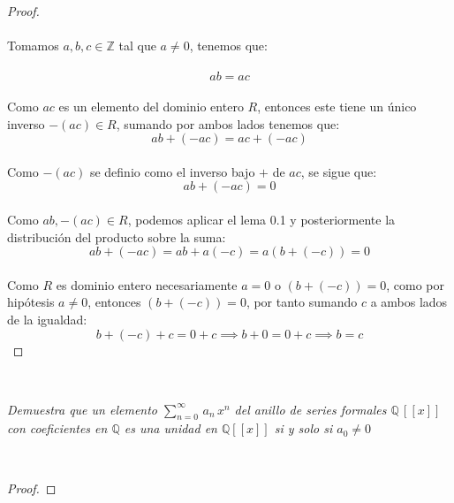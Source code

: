 \documentclass[11pt,letterpaper]{article}
\newcommand{\Z}{\mathbb{Z}}
\newcommand{\Q}{\mathbb{Q}}
\begin{document}
    \begin{proof}\,\\
    \,\\
    Tomamos  $a,b,c\in \Z$ tal que $a\neq 0$, tenemos que:\,\\
    \,\\
    \begin{equation*}
        ab=ac
    \end{equation*}\,\\
    Como $ac$ es un elemento del dominio entero $R$, entonces este tiene un \'unico inverso $-(ac)\in R$, sumando por ambos
    lados tenemos que:\,\\
    \begin{equation*}
        ab+(-ac)=ac+(-ac)
    \end{equation*}\,\\
    Como $-(ac)$ se definio como el inverso bajo $+$ de $ac$, se sigue que:\,\\
    \begin{equation*}
        ab+(-ac)=0
    \end{equation*}\,\\
    Como $ab,-(ac)\in R$, podemos aplicar el lema 0.1 y posteriormente la distribuci\'on del producto sobre la suma:\,\\
    \begin{equation*}
        ab+(-ac)=ab+a(-c)=a(b+(-c))=0
    \end{equation*}\,\\
    Como $R$ es dominio entero necesariamente $a=0$ o $(b+(-c))=0$, como por hip\'otesis $a\neq 0$, entonces
    $(b+(-c))=0$, por tanto sumando $c$ a ambos lados de la igualdad:\,\\
    \begin{equation*}
        b+(-c)+c=0+c\implies b+0=0+c\implies b=c
    \end{equation*}
\end{proof}\,\\
\begin{tcolorbox}[
	title = \textcolor{black}{\textcolor{white}{Problema 1}},]
\textit{Demuestra que un elemento $\displaystyle \sum_{n=0}^{\infty}\,a_n\,x^n$ del anillo de series formales $\Q\,[[x]]$
con coeficientes en $\Q$ es una unidad en $\Q[[x]]$ si y solo si $a_0\neq 0$
}
\end{tcolorbox}\,\\
\begin{proof}
    
\end{proof}\,\\
\end{document}
